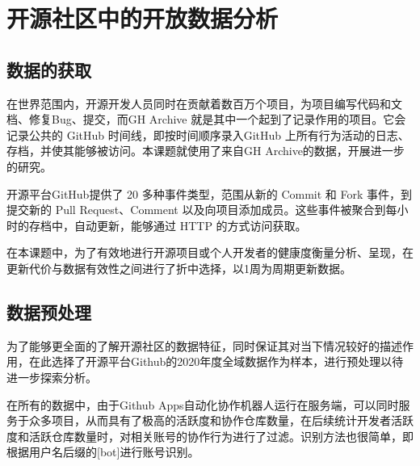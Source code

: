 \section{开源社区中的开放数据分析}

\subsection{数据的获取}
\par 在世界范围内，开源开发人员同时在贡献着数百万个项目，为项目编写代码和文档、修复Bug、提交，而GH Archive 就是其中一个起到了记录作用的项目。它会记录公共的 GitHub 时间线，即按时间顺序录入GitHub 上所有行为活动的日志、存档，并使其能够被访问。本课题就使用了来自GH Archive的数据，开展进一步的研究。

\par 开源平台GitHub提供了 20 多种事件类型，范围从新的 Commit 和 Fork 事件，到提交新的 Pull Request、Comment 以及向项目添加成员。这些事件被聚合到每小时的存档中，自动更新，能够通过 HTTP 的方式访问获取。

\par 在本课题中，为了有效地进行开源项目或个人开发者的健康度衡量分析、呈现，在更新代价与数据有效性之间进行了折中选择，以1周为周期更新数据。

\subsection{数据预处理}
\par 为了能够更全面的了解开源社区的数据特征，同时保证其对当下情况较好的描述作用，在此选择了开源平台Github的2020年度全域数据作为样本，进行预处理以待进一步探索分析。

\par 在所有的数据中，由于Github Apps自动化协作机器人运行在服务端，可以同时服务于众多项目，从而具有了极高的活跃度和协作仓库数量，在后续统计开发者活跃度和活跃仓库数量时，对相关账号的协作行为进行了过滤。识别方法也很简单，即根据用户名后缀的[bot]进行账号识别。



